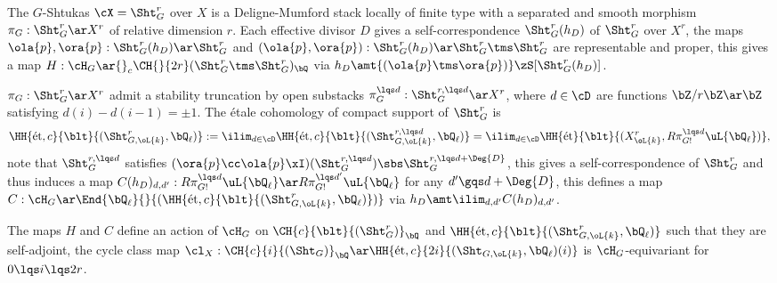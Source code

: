 \documentclass[article, a4paper, twoside]{universal}
\begin{document}
\begin{stp}
	The $G$-Shtukas $\cX=\Sht_{G}^{r}$ over $X$ is a Deligne-Mumford stack locally of finite type with a separated and smooth morphism $\pi_{G}:\Sht_{G}^{r}\ar X^{r}$ of relative dimension $r$. Each effective divisor $D$ gives a self-correspondence $\Sht_{G}^{r}(h_{D})$ of $\Sht_{G}^{r}$ over $X^{r}$, the maps $\ola{p},\ora{p}:\Sht_{G}^{r}(h_{D})\ar\Sht_{G}^{r}$ and $(\ola{p},\ora{p}):\Sht_{G}^{r}(h_{D})\ar\Sht_{G}^{r}\tms\Sht_{G}^{r}$ are representable and proper, this gives a map $H:\cH_{G}\ar{}_{c}\CH{}{2r}(\Sht_{G}^{r}\tms\Sht_{G}^{r})_{\bQ}$ via $h_{D}\amt{(\ola{p}\tms\ora{p})}\zS[\Sht_{G}^{r}(h_{D})]$.

	$\pi_{G}:\Sht_{G}^{r}\ar X^{r}$ admit a stability truncation by open substacks $\pi_{G}^{\lqs d}:\Sht_{G}^{r,\lqs d}\ar X^{r}$, where $d\in\cD$ are functions $\bZ/r\bZ\ar\bZ$ satisfying $d(i)-d(i-1)=\pm1$. The {\'e}tale cohomology of compact support of $\Sht_{G}^{r}$ is
	\[
		\HH{\text{{\'e}t},c}{\blt}{(\Sht_{G,\oL{k}}^{r},\bQ_{\ell})}:=\ilim_{d\in\cD}\HH{\text{{\'e}t},c}{\blt}{(\Sht_{G,\oL{k}}^{r,\lqs d},\bQ_{\ell})}=\ilim_{d\in\cD}\HH{\text{{\'e}t}}{\blt}{(X_{\oL{k}}^{r},R\pi_{G!}^{\lqs d}\uL{\bQ_{\ell}})},
	\]
	note that $\Sht_{G}^{r,\lqs d}$ satisfies $(\ora{p}\cc\ola{p}\xI)(\Sht_{G}^{r,\lqs d})\sbs\Sht_{G}^{r,\lqs d+\Deg{D}}$, this gives a self-correspondence of $\Sht_{G}^{r}$ and thus induces a map $C(h_{D})_{d,d'}:R\pi_{G!}^{\lqs d}\uL{\bQ_{\ell}}\ar R\pi_{G!}^{\lqs d'}\uL{\bQ_{\ell}}$ for any $d'\gqs d+\Deg{D}$, this defines a map $C:\cH_{G}\ar\End{\bQ_{\ell}}{}{(\HH{\text{{\'e}t},c}{\blt}{(\Sht_{G,\oL{k}}^{r},\bQ_{\ell})})}$ via $h_{D}\amt \ilim_{d,d'}C(h_{D})_{d,d'}$.
\end{stp}

\begin{thm}
	The maps $H$ and $C$ define an action of $\cH_{G}$ on $\CH{c}{\blt}{(\Sht_{G}^{r})}_{\bQ}$ and $\HH{\text{{\'e}t},c}{\blt}{(\Sht_{G,\oL{k}}^{r},\bQ_{\ell})}$ such that they are self-adjoint, the cycle class map $\cl_{X}:\CH{c}{i}{(\Sht_{G})}_{\bQ}\ar\HH{\text{{\'e}t},c}{2i}{(\Sht_{G,\oL{k}},\bQ_{\ell})(i)}$ is $\cH_{G}$-equivariant for $0\lqs i\lqs 2r$.
\end{thm}

\end{document}
